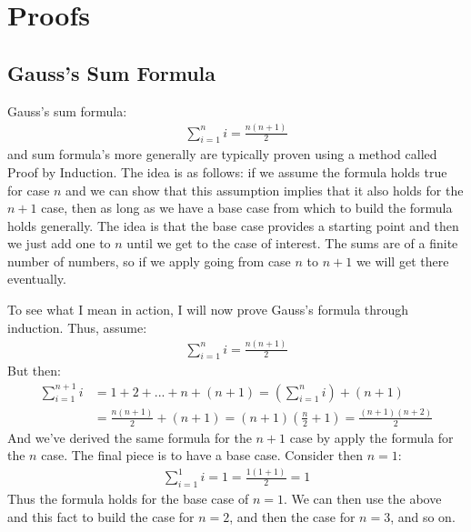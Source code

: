 \documentclass{article}
\begin{document}
\section{Proofs}
\subsection{Gauss's Sum Formula}
Gauss's sum formula:
\begin{gather*}
	\sum_{i = 1}^{n}i = \frac{n(n + 1)}{2}
\end{gather*}
and sum formula's more generally are typically proven using a method called Proof by Induction. The idea is as follows: if we assume the formula holds true for case $n$ and we can show that this assumption implies that it also holds for the $n + 1$ case, then as long as we have a base case from which to build the formula holds generally. The idea is that the base case provides a starting point and then we just add one to $n$ until we get to the case of interest. The sums are of a finite number of numbers, so if we apply going from case $n$ to $n + 1$ we will get there eventually.

To see what I mean in action, I will now prove Gauss's formula through induction. Thus, assume:
\begin{gather*}
	\sum_{i = 1}^{n}i = \frac{n(n + 1)}{2}
\end{gather*}
But then:
\begin{align*}
	\sum_{i = 1}^{n + 1}i &= 1 + 2 + ... + n + (n + 1) = \left(\sum_{i = 1}^{n}i\right) + (n + 1)\\
	&= \frac{n(n + 1)}{2} + (n + 1) = (n + 1)\left(\frac{n}{2} + 1\right) = \frac{(n + 1)(n + 2)}{2}
\end{align*}
And we've derived the same formula for the $n + 1$ case by apply the formula for the $n$ case. The final piece is to have a base case. Consider then $n = 1$:
\begin{gather*}
	\sum_{i = 1}^{1}i = 1 = \frac{1(1 + 1)}{2} = 1
\end{gather*}
Thus the formula holds for the base case of $n = 1$. We can then use the above and this fact to build the case for $n = 2$, and then the case for $n = 3$, and so on.
\end{document}
